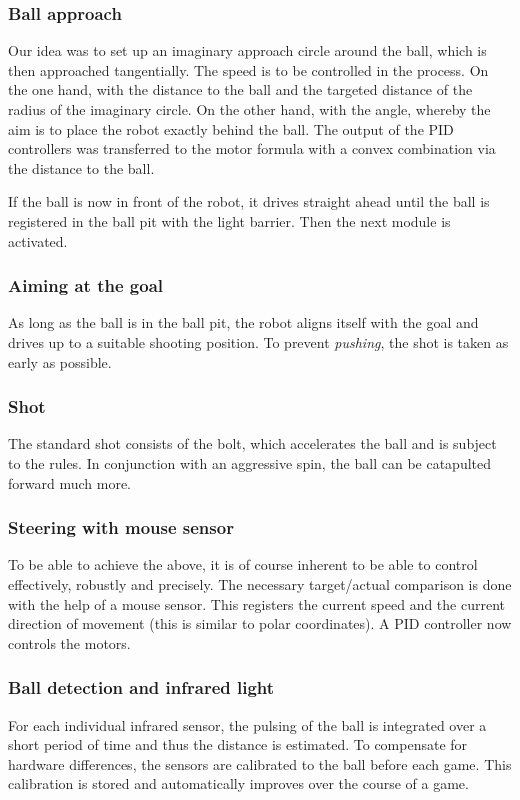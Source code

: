 \subsubsection{Ball approach}
Our idea was to set up an imaginary approach circle around the ball, which is then approached tangentially. The speed is to be controlled in the process.
On the one hand, with the distance to the ball and the targeted distance of the radius of the imaginary circle.
On the other hand, with the angle, whereby the aim is to place the robot exactly behind the ball. 
The output of the PID controllers was transferred to the motor formula with a convex combination via the distance to the ball.

If the ball is now in front of the robot, it drives straight ahead until the ball is registered in the ball pit with the light barrier. Then the next module is activated.

\subsubsection{Aiming at the goal}
As long as the ball is in the ball pit, the robot aligns itself with the goal and drives up to a suitable shooting position. To prevent \textit{pushing}, the shot is taken as early as possible.

\subsubsection{Shot}
The standard shot consists of the bolt, which accelerates the ball and is subject to the rules. In conjunction with an aggressive spin, the ball can be catapulted forward much more.

\subsubsection{Steering with mouse sensor}
To be able to achieve the above, it is of course inherent to be able to control effectively, robustly and precisely.
The necessary target/actual comparison is done with the help of a mouse sensor.
This registers the current speed and the current direction of movement (this is similar to polar coordinates). A PID controller now controls the motors.

\subsubsection{Ball detection and infrared light}
For each individual infrared sensor, the pulsing of the ball is integrated over a short period of time and thus the distance is estimated.
To compensate for hardware differences, the sensors are calibrated to the ball before each game. This calibration is stored and automatically improves over the course of a game. 

